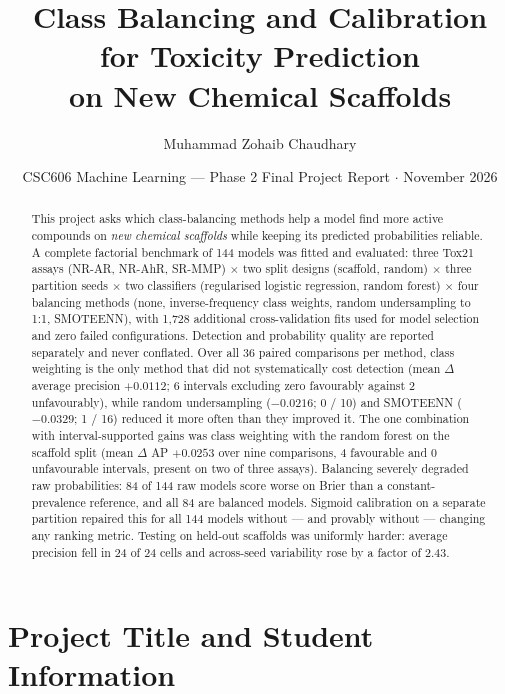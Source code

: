 \documentclass[10pt,letterpaper]{article}
\title{\vspace{-1.1cm}\textbf{Class Balancing and Calibration for Toxicity Prediction\\ on New Chemical Scaffolds}}
\author{Muhammad Zohaib Chaudhary}
\date{CSC606 Machine Learning --- Phase 2 Final Project Report \quad$\cdot$\quad 25 November 2026}
\begin{document}
\maketitle
\vspace{-0.7cm}

\begin{abstract}
\noindent\small
This project asks which class-balancing methods help a model find more active compounds on
\emph{new chemical scaffolds} while keeping its predicted probabilities reliable. A complete
factorial benchmark of 144 models was fitted and evaluated: three Tox21 assays (NR-AR, NR-AhR,
SR-MMP) $\times$ two split designs (scaffold, random) $\times$ three partition seeds $\times$ two
classifiers (regularised logistic regression, random forest) $\times$ four balancing methods (none,
inverse-frequency class weights, random undersampling to 1:1, SMOTEENN), with 1{,}728 additional
cross-validation fits used for model selection and zero failed configurations. Detection and
probability quality are reported separately and never conflated. Over all 36 paired comparisons per
method, class weighting is the only method that did not systematically cost detection (mean
$\Delta$ average precision $+0.0112$; 6 intervals excluding zero favourably against 2 unfavourably),
while random undersampling ($-0.0216$; 0 / 10) and SMOTEENN ($-0.0329$; 1 / 16) reduced it more
often than they improved it. The one combination with interval-supported gains was class weighting
with the random forest on the scaffold split (mean $\Delta$ AP $+0.0253$ over nine comparisons, 4
favourable and 0 unfavourable intervals, present on two of three assays). Balancing severely
degraded raw probabilities: 84 of 144 raw models score worse on Brier than a constant-prevalence
reference, and all 84 are balanced models. Sigmoid calibration on a separate partition repaired
this for all 144 models without --- and provably without --- changing any ranking metric. Testing on
held-out scaffolds was uniformly harder: average precision fell in 24 of 24 cells and across-seed
variability rose by a factor of 2.43.
\end{abstract}

{\small\vspace{-0.3cm}\tableofcontents}
\vspace{0.2cm}

\section{Project Title and Student Information}
\end{document}
